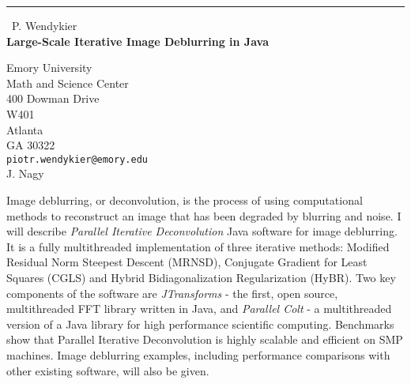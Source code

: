 \documentclass{report}
\begin{document}
\begin{center}
\rule{6in}{1pt} \
{\large P. Wendykier \\
{\bf Large-Scale Iterative Image Deblurring in Java}}

Emory University \\ Math and Science Center \\ 400 Dowman Drive \\ W401 \\ Atlanta \\ GA 30322
\\
{\tt piotr.wendykier@emory.edu}\\
J. Nagy\end{center}

Image deblurring, or deconvolution, is the process of using computational
methods to reconstruct an image that has been degraded by blurring
and noise. I will describe \emph{Parallel Iterative Deconvolution}
Java software for image deblurring. It is a fully multithreaded implementation
of three iterative methods: Modified Residual Norm Steepest Descent
(MRNSD), Conjugate Gradient for Least Squares (CGLS) and Hybrid Bidiagonalization
Regularization (HyBR). Two key components of the software are \emph{JTransforms}
- the first, open source, multithreaded FFT library written in Java,
and \emph{Parallel Colt} - a multithreaded version of a Java library
for high performance scientific computing. Benchmarks show that Parallel
Iterative Deconvolution is highly scalable and efficient on SMP machines.
Image deblurring examples, including performance comparisons with
other existing software, will also be given.
\end{document}
